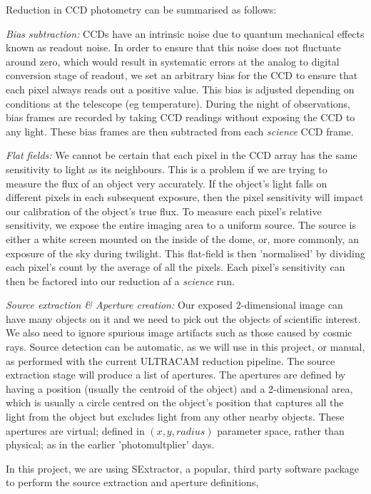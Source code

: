 Reduction in CCD photometry can be summarised as follows: 

\emph{Bias subtraction:}
CCDs have an intrinsic noise due to quantum mechanical effects known as readout noise. In order to ensure that this noise does not fluctuate around zero, which would result in systematic errors at the analog to digital conversion stage of readout, we set an arbitrary bias for the CCD to ensure that each pixel always reads out a positive value. This bias is adjusted depending on conditions at the telescope (eg temperature). During the night of observations, bias frames are recorded by taking CCD readings without exposing the CCD to any light. These bias frames are then subtracted from each \emph{science} CCD frame. 

\emph{Flat fields:}
We cannot be certain that each pixel in the CCD array has the same sensitivity to light as its neighbours. This is a problem if we are trying to measure the flux of an object very accurately. If the object's light falls on different pixels in each subsequent exposure, then the pixel sensitivity will impact our calibration of the object's true flux. To measure each pixel's relative sensitivity, we expose the entire imaging area to a uniform source. The source is either a white screen mounted on the inside of the dome, or, more commonly, an exposure of the sky during twilight. This flat-field is then 'normalised' by dividing each pixel's count by the average of all the pixels. Each pixel's sensitivity can then be factored into our reduction af a \emph{science} run. 

\emph{Source extraction \& Aperture creation:}
Our exposed 2-dimensional image can have many objects on it and we need to pick out the objects of scientific interest. We also need to ignore spurious image artifacts such as those caused by cosmic rays. Source detection can be automatic, as we will use in this project, or manual, as performed with the current ULTRACAM reduction pipeline. The source extraction stage will produce a list of apertures. The apertures are defined by having a position (usually the centroid of the object) and a 2-dimensional area, which is usually a circle centred on the object's position that captures all the light from the object but excludes light from any other nearby objects. These apertures are virtual; defined in $(x, y, radius)$ parameter space, rather than physical; as in the earlier 'photomultplier' days. 

In this project, we are using {SExtractor}, a popular, third party software package to perform the source extraction and aperture definitions, \cite{bertin}

